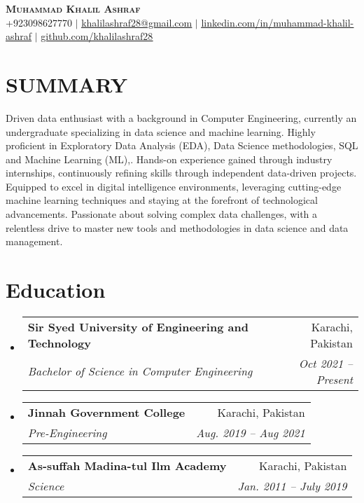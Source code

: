 \documentclass[letterpaper,11pt]{article}
\makeatletter
\newcommand{\resumeSubheading}[4]{
  \vspace{-2pt}\item
    \begin{tabular*}{0.97\textwidth}[t]{l@{\extracolsep{\fill}}r}
      \textbf{#1} & #2 \\
      \textit{\small#3} & \textit{\small #4} \\
    \end{tabular*}\vspace{-7pt}
}
\newcommand{\resumeSubHeadingListStart}{\begin{itemize}[leftmargin=0.15in, label={}]}
\newcommand{\resumeSubHeadingListEnd}{\end{itemize}}
\makeatother
\begin{document}
\begin{center}
    \textbf{\Huge \scshape Muhammad Khalil Ashraf} \\ \vspace{1pt}
    \small +923098627770 $|$ \href{mailto:khalilashraf28@gmail.com}{\underline{khalilashraf28@gmail.com}} $|$ 
    \href{https://www.linkedin.com/in/muhammad-khalil-ashraf-95061a270/}{\underline{linkedin.com/in/muhammad-khalil-ashraf}} $|$
    \href{https://github.com/khalilashraf28}{\underline{github.com/khalilashraf28}}
\end{center}

\section{SUMMARY}
\justify
Driven data enthusiast with a background in Computer Engineering, currently an undergraduate specializing in data science and machine learning. Highly proficient in Exploratory Data Analysis (EDA), Data Science methodologies, SQL and Machine Learning (ML),. Hands-on experience gained through industry internships, continuously refining skills through independent data-driven projects. Equipped to excel in digital intelligence environments, leveraging cutting-edge machine learning techniques and staying at the forefront of technological advancements. Passionate about solving complex data challenges, with a relentless drive to master new tools and methodologies in data science and data management.

\section{Education}
  \resumeSubHeadingListStart
    \resumeSubheading
      {Sir Syed University of Engineering and Technology}{Karachi, Pakistan}
      {Bachelor of Science in Computer Engineering}{ Oct 2021 -- Present}
    \resumeSubheading
      {Jinnah Government College}{Karachi, Pakistan}
      {Pre-Engineering}{Aug. 2019 -- Aug 2021}
    \resumeSubheading
      {As-suffah Madina-tul Ilm Academy}{Karachi, Pakistan}
      {Science}{Jan. 2011 -- July 2019}
  \resumeSubHeadingListEnd


\end{document}
